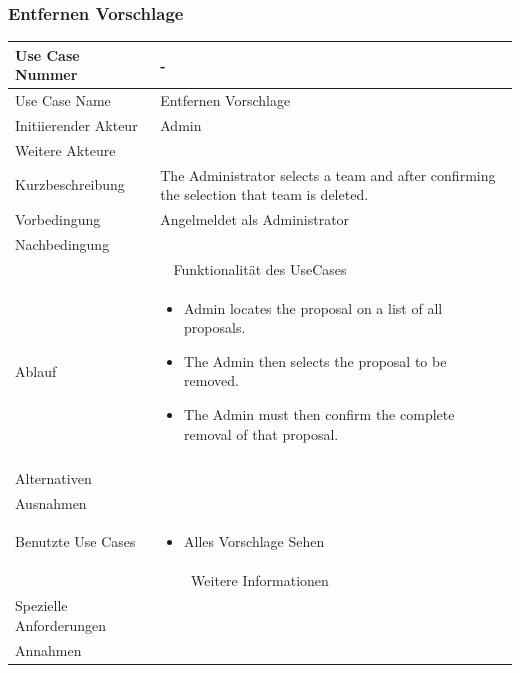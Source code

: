 \documentclass[10pt,a4paper]{article}
\begin{document}
	\subsubsection{Entfernen Vorschlage}
	\begin{tabular}{|l|p{.5\linewidth}|}
	\hline Use Case Nummer & - \\ 
	\hline Use Case Name & Entfernen Vorschlage \\ 
	\hline Initiierender Akteur & Admin \\
	\hline Weitere Akteure & \\
	\hline Kurzbeschreibung & The Administrator selects a team and after confirming the selection that team is deleted. \\
	\hline Vorbedingung & Angelmeldet als Administrator \\
	\hline Nachbedingung &  \\
	\hline \multicolumn{2}{|c|}{Funktionalität des UseCases}\\
	\hline Ablauf & \begin{itemize}
			\item Admin locates the proposal on a list of all proposals.
			\item The Admin then selects the proposal to be removed.
			\item The Admin must then confirm the complete removal of that proposal.
		\end{itemize} \\ \\
	\hline Alternativen &  \\
	\hline Ausnahmen &  \\
	\hline Benutzte Use Cases & \begin{itemize}
			\item Alles Vorschlage Sehen
		\end{itemize} \\
	\hline \multicolumn{2}{|c|}{Weitere Informationen} \\
	\hline Spezielle Anforderungen &  \\
	\hline Annahmen &  \\
	\hline
	\end{tabular}
	
\end{document}
